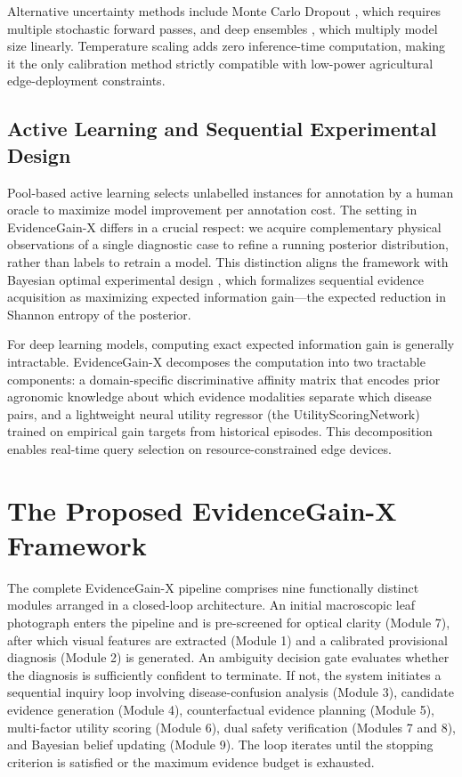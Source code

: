 \documentclass[conference]{IEEEtran}
\begin{document}
Alternative uncertainty methods include Monte Carlo Dropout \cite{gal2016}, which requires multiple stochastic forward passes, and deep ensembles \cite{lakshminarayanan2017}, which multiply model size linearly. Temperature scaling adds zero inference-time computation, making it the only calibration method strictly compatible with low-power agricultural edge-deployment constraints.

\subsection{Active Learning and Sequential Experimental Design}
Pool-based active learning \cite{settles2009} selects unlabelled instances for annotation by a human oracle to maximize model improvement per annotation cost. The setting in EvidenceGain-X differs in a crucial respect: we acquire complementary physical observations of a single diagnostic case to refine a running posterior distribution, rather than labels to retrain a model. This distinction aligns the framework with Bayesian optimal experimental design \cite{chaloner1995, lindley1956}, which formalizes sequential evidence acquisition as maximizing expected information gain---the expected reduction in Shannon entropy of the posterior.

For deep learning models, computing exact expected information gain is generally intractable. EvidenceGain-X decomposes the computation into two tractable components: a domain-specific discriminative affinity matrix that encodes prior agronomic knowledge about which evidence modalities separate which disease pairs, and a lightweight neural utility regressor (the UtilityScoringNetwork) trained on empirical gain targets from historical episodes. This decomposition enables real-time query selection on resource-constrained edge devices.

\section{The Proposed EvidenceGain-X Framework}

The complete EvidenceGain-X pipeline comprises nine functionally distinct modules arranged in a closed-loop architecture. An initial macroscopic leaf photograph enters the pipeline and is pre-screened for optical clarity (Module 7), after which visual features are extracted (Module 1) and a calibrated provisional diagnosis (Module 2) is generated. An ambiguity decision gate evaluates whether the diagnosis is sufficiently confident to terminate. If not, the system initiates a sequential inquiry loop involving disease-confusion analysis (Module 3), candidate evidence generation (Module 4), counterfactual evidence planning (Module 5), multi-factor utility scoring (Module 6), dual safety verification (Modules 7 and 8), and Bayesian belief updating (Module 9). The loop iterates until the stopping criterion is satisfied or the maximum evidence budget is exhausted.
\end{document}
